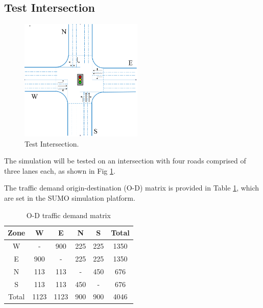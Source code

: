 \documentclass[a4paper, 10pt, conference]{ieeeconf}      %
\begin{document}
\subsection{Test Intersection}
\begin{figure}[thpb]
        \centering
        \includegraphics[width=2.3in]{figures/Intersection.PNG}
        \caption{Test Intersection.}
        \label{fig:Intersection}
\end{figure}

The simulation will be tested on an intersection with four roads comprised of three lanes each, as shown in Fig \ref{fig:Intersection}.


The traffic demand origin-destination (O-D) matrix is provided in Table \ref{Tab:ODMatrix}, which are set in the SUMO simulation platform.
\begin{table}[h]
        \caption{O-D traffic demand matrix}
        \label{Tab:ODMatrix}
        \begin{center}
                \begin{tabular}{|c|c|c|c|c|c|}
                        \hline
                        Zone&W&E&N&S&Total\\
                        \hline
                        W&-&900&225&225&1350\\
                        \hline
                        E&900&-&225&225&1350\\
                        \hline
                        N&113&113&-&450&676\\
                        \hline
                        S&113&113&450&-&676\\
                        \hline
                        Total&1123&1123&900&900&4046\\
                        \hline
                \end{tabular}
        \end{center}
\end{table}
\end{document}

